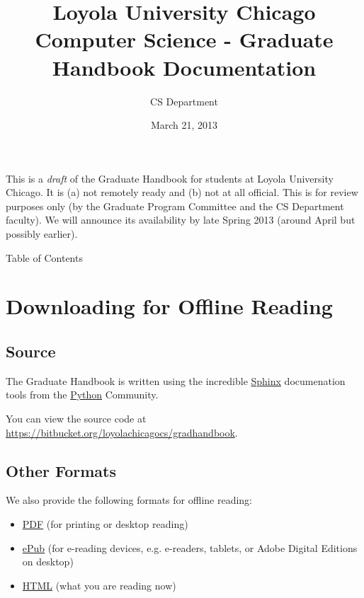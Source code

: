 \documentclass[letterpaper,10pt,english]{sphinxmanual}
\title{Loyola University Chicago Computer Science - Graduate Handbook Documentation}
\date{March 21, 2013}
\author{CS Department}
\begin{document}
\maketitle
\tableofcontents
{}\label{index::doc}


This is a \emph{draft} of the Graduate Handbook for students at Loyola University
Chicago. It is (a) not remotely ready and (b) not at all official.
This is for review purposes only (by the Graduate Program Committee and
the CS Department faculty). We will
announce its availability by late Spring 2013 (around April but possibly
earlier).

Table of Contents


\chapter{Downloading for Offline Reading}
\label{downloading:downloading-for-offline-reading}\label{downloading::doc}\label{downloading:loyola-university-chicago-computer-science-graduate-handbook}

\section{Source}
\label{downloading:source}
The Graduate Handbook is written using the incredible \href{http://sphinx-doc.org/}{Sphinx} documenation tools from the \href{http://python.org}{Python} Community.

You can view the source code at \href{https://bitbucket.org/loyolachicagocs/gradhandbook}{https://bitbucket.org/loyolachicagocs/gradhandbook}.


\section{Other Formats}
\label{downloading:other-formats}
We also provide the following formats for offline reading:
\begin{itemize}
\item {} 
\href{http://gradhandbook.cs.luc.edu/latex/LoyolaComputerScienceGradHandbook.pdf}{PDF} (for printing or desktop reading)

\item {} 
\href{http://gradhandbook.cs.luc.edu/epub/LoyolaComputerScienceGradHandbook.epub}{ePub} (for e-reading devices, e.g. e-readers, tablets, or Adobe Digital Editions on desktop)

\item {} 
\href{http://gradhandbook.cs.luc.edu/}{HTML} (what you are reading now)

\end{itemize}
\end{document}
